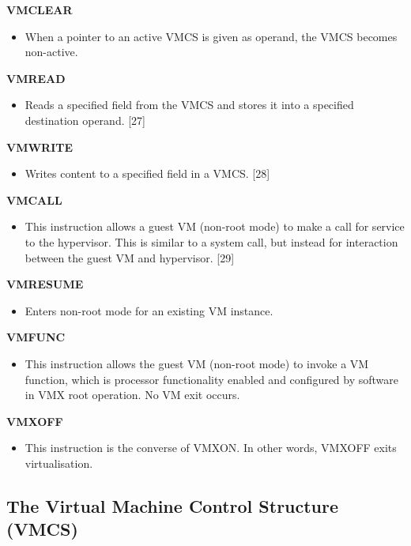 \documentclass{report}
\begin{document}
\begin{spacing}{1.5}
{\textbf{VMCLEAR}
\begin{itemize}
\item[] {\large When a pointer to an active VMCS is given as operand, the VMCS becomes non-active. ~\cite{bhushanmodelling}}
\end{itemize}


\textbf{VMREAD}
\begin{itemize}
\item[] {\large Reads a specified field from the VMCS and stores it into a specified destination operand. [27]}
\end{itemize}

\textbf{VMWRITE}
\begin{itemize}
\item[] {\large Writes content to a specified field in a VMCS. [28]}
\end{itemize}

\textbf{VMCALL}
\begin{itemize}
\item[] {\large This instruction allows a guest VM (non-root mode) to make a call for service to the hypervisor. This is similar to a system call, but instead for interaction between the guest VM and hypervisor. [29]}
\end{itemize}

\textbf{VMRESUME}
\begin{itemize}
\item[] Enters non-root mode for an existing VM instance.
\end{itemize}

\textbf{VMFUNC}
\begin{itemize}
\item[] {\large This instruction allows the guest VM (non-root mode) to invoke a VM function, which is processor functionality enabled and configured by software in VMX root operation. No VM exit occurs. }
\end{itemize}

\textbf{VMXOFF}
\begin{itemize}
\item[] {\large This instruction is the converse of VMXON. In other words, VMXOFF exits virtualisation. }
\end{itemize}

\leavevmode\newline
}



\subsection{The Virtual Machine Control Structure (VMCS)}


\end{spacing}
\end{document}
